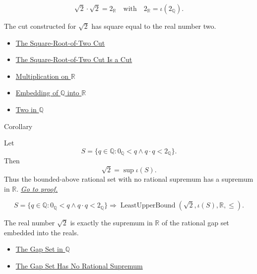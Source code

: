 \begin{remark*}
\[
\sqrt{2}\cdot\sqrt{2}=2_{\mathbb{R}}
\quad\text{with}\quad
2_{\mathbb{R}}=\iota(2_{\mathbb{Q}}).
\]
\end{remark*}

\begin{remark*}[Interpretation]
The cut constructed for $\sqrt{2}$ has square equal to the real number two.
\end{remark*}

\begin{dependencies}
\begin{itemize}
  \item \hyperref[def:sqrt-two-cut]{The Square-Root-of-Two Cut}
  \item \hyperref[lem:sqrt-two-is-a-cut]{The Square-Root-of-Two Cut Is a Cut}
  \item \hyperref[def:multiplication-on-r]{Multiplication on $\mathbb{R}$}
  \item \hyperref[def:real-chapter-embedding-q-into-r]{Embedding of $\mathbb{Q}$ into $\mathbb{R}$}
  \item \hyperref[def:two-in-q]{Two in $\mathbb{Q}$}
\end{itemize}
\end{dependencies}

\begin{corollarybox}{Corollary}
\begin{corollary}
\label{cor:r-fills-the-gap}
Let
\[
S=\{q\in\mathbb{Q}:0_{\mathbb{Q}}<q\land q\cdot q<2_{\mathbb{Q}}\}.
\]
Then
\[
\sqrt{2}=\sup \iota(S).
\]
Thus the bounded-above rational set with no rational supremum has a supremum
in $\mathbb{R}$.
\hyperref[prf:r-fills-the-gap]{\textit{Go to proof.}}
\end{corollary}
\end{corollarybox}

\begin{remark*}
\[
S=\{q\in\mathbb{Q}:0_{\mathbb{Q}}<q\land q\cdot q<2_{\mathbb{Q}}\}
\Longrightarrow
\operatorname{LeastUpperBound}(\sqrt{2},\iota(S),\mathbb{R},\le).
\]
\end{remark*}

\begin{remark*}[Interpretation]
The real number $\sqrt{2}$ is exactly the supremum in $\mathbb{R}$ of the rational gap set embedded into the reals.
\end{remark*}

\begin{dependencies}
\begin{itemize}
  \item \hyperref[def:gap-set-q]{The Gap Set in $\mathbb{Q}$}
  \item \hyperref[thm:gap-set-no-rational-supremum-q]{The Gap Set Has No Rational Supremum}
\end{itemize}
\end{dependencies}
